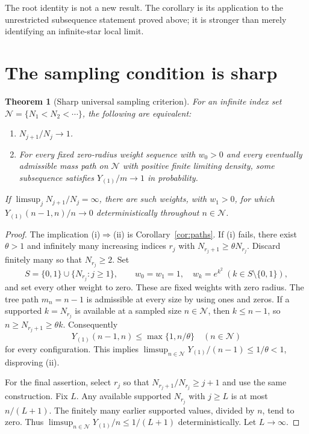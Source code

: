 \documentclass[11pt]{article}
\newtheorem{theorem}{Theorem}
\theoremstyle{remark}\newtheorem{remark}[theorem]{Remark}
\begin{document}
The root identity is not a new result. The corollary is its application
to the unrestricted subsequence statement proved above; it is stronger
than merely identifying an infinite-star local limit.

\section{The sampling condition is sharp}\label{sec:sharp}
\begin{theorem}[Sharp universal sampling criterion]\label{thm:sampling}
For an infinite index set $\mathcal N=\{N_1<N_2<\cdots\}$, the following
are equivalent:
\begin{enumerate}[label=(\roman*)]
\item $N_{j+1}/N_j\to1$.
\item For every fixed zero-radius weight sequence with $w_0>0$ and every
      eventually admissible mass path on $\mathcal N$ with positive finite
      limiting density, some subsequence satisfies $Y_{(1)}/m\to1$ in
      probability.
\end{enumerate}
If $\limsup_jN_{j+1}/N_j=\infty$, there are such weights, with $w_1>0$, for
which $Y_{(1)}(n-1,n)/n\to0$ deterministically throughout $n\in\mathcal N$.
\end{theorem}

\begin{proof}
The implication (i)$\Rightarrow$(ii) is Corollary~\ref{cor:paths}.
If (i) fails, there exist $\theta>1$ and infinitely many increasing indices
$r_j$ with $N_{r_j+1}\ge\theta N_{r_j}$. Discard finitely many so that
$N_{r_j}\ge2$. Set
\[
 S=\{0,1\}\cup\{N_{r_j}:j\ge1\},\qquad
 w_0=w_1=1,\quad w_k=e^{k^2}\ (k\in S\setminus\{0,1\}),
\]
and set every other weight to zero. These are fixed weights with zero
radius. The tree path $m_n=n-1$ is admissible at every size by using ones
and zeros. If a supported $k=N_{r_j}$ is available at a sampled size
$n\in\mathcal N$, then $k\le n-1$, so
$n\ge N_{r_j+1}\ge\theta k$. Consequently
\[
 Y_{(1)}(n-1,n)\le\max\{1,n/\theta\}
 \quad(n\in\mathcal N)
\]
for every configuration. This implies
$\limsup_{n\in\mathcal N}Y_{(1)}/(n-1)\le1/\theta<1$, disproving (ii).

For the final assertion, select $r_j$ so that
$N_{r_j+1}/N_{r_j}\ge j+1$ and use the same construction. Fix $L$.
Any available supported $N_{r_j}$ with $j\ge L$ is at most $n/(L+1)$.
The finitely many earlier supported values, divided by $n$, tend to zero.
Thus $\limsup_{n\in\mathcal N}Y_{(1)}/n\le1/(L+1)$ deterministically.
Let $L\to\infty$.
\end{proof}
\end{document}
